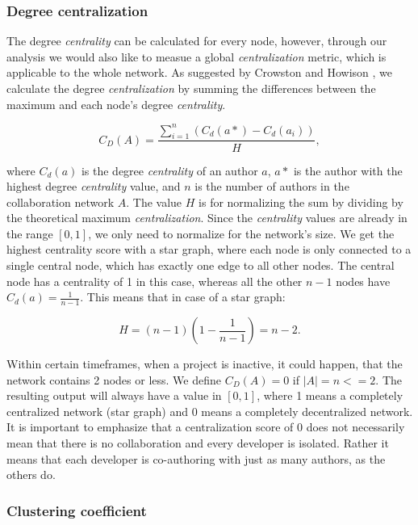\subsubsection{Degree centralization}

The degree \textit{centrality} can be calculated for every node, however, through our analysis we would also like to measue a global \textit{centralization} metric, which is applicable to the whole network. As suggested by Crowston and Howison \cite{crowstonHierarchyCentralizationFree2006}, we calculate the degree \textit{centralization} by summing the differences between the maximum and each node's degree \textit{centrality}. 

\[ C_D(A) = \frac{\sum_{i=1}^n(C_d(a*)-C_d(a_i))}{H}, \]

where $C_d(a)$ is the degree \textit{centrality} of an author $a$, $a*$ is the author with the highest degree \textit{centrality} value, and $n$ is the number of authors in the collaboration network $A$. The value $H$ is for normalizing the sum by dividing by the theoretical maximum \textit{centralization}. Since the \textit{centrality} values are already in the range $[0, 1]$, we only need to normalize for the network's size. We get the highest centrality score with a star graph, where each node is only connected to a single central node, which has exactly one edge to all other nodes. The central node has a centrality of 1 in this case, whereas all the other $n-1$ nodes have $C_d(a) = \frac{1}{n-1}$. This means that in case of a star graph:

\[ H = (n-1) (1-\frac{1}{n-1}) = n-2. \]

Within certain timeframes, when a project is inactive, it could happen, that the network contains 2 nodes or less. We define $C_D(A) = 0$ if $|A| = n <=2$. The resulting output will always have a value in $[0, 1]$, where 1 means a completely centralized network (star graph) and 0 means a completely decentralized network. It is important to emphasize that a centralization score of 0 does not necessarily mean that there is no collaboration and every developer is isolated. Rather it means that each developer is co-authoring with just as many authors, as the others do.



\subsubsection{Clustering coefficient}
\label{sec:clustering}

